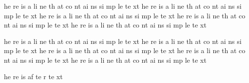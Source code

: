 he
re
is
a
li
ne
th
at
co
nt
ai
ns
si
mp
le
te
xt
he
re
is
a
li
ne
th
at
co
nt
ai
ns
si
mp
le
te
xt
he
re
is
a
li
ne
th
at
co
nt
ai
ns
si
mp
le
te
xt
he
re
is
a
li
ne
th
at
co
nt
ai
ns
si
mp
le
te
xt
he
re
is
a
li
ne
th
at
co
nt
ai
ns
si
mp
le
te
xt

he
re
is
a
li
ne
th
at
co
nt
ai
ns
si
mp
le
te
xt
he
re
is
a
li
ne
th
at
co
nt
ai
ns
si
mp
le
te
xt
he
re
is
a
li
ne
th
at
co
nt
ai
ns
si
mp
le
te
xt
he
re
is
a
li
ne
th
at
co
nt
ai
ns
si
mp
le
te
xt
he
re
is
a
li
ne
th
at
co
nt
ai
ns
si
mp
le
te
xt

he
re
is
af
te
r
te
xt%
